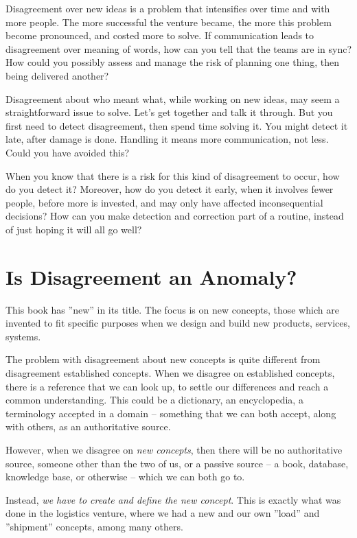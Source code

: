 \documentclass[graybox,envcountchap,sectrefs]{svmono}
\begin{document}
Disagreement over new ideas is a problem that intensifies over time and with more people. The more successful the venture became, the more this problem become pronounced, and costed more to solve. If communication leads to disagreement over meaning of words, how can you tell that the teams are in sync? How could you possibly assess and manage the risk of planning one thing, then being delivered another? 

Disagreement about who meant what, while working on new ideas, may seem a straightforward issue to solve. Let's get together and talk it through. But you first need to detect disagreement, then spend time solving it. You might detect it late, after damage is done. Handling it means more communication, not less. Could you have avoided this? 

When you know that there is a risk for this kind of disagreement to occur, how do you detect it? Moreover, how do you detect it early, when it involves fewer people, before more is invested, and may only have affected inconsequential decisions? How can you make detection and correction part of a routine, instead of just hoping it will all go well?

\section{Is Disagreement an Anomaly?}
This book has ''new'' in its title. The focus is on new concepts, those which are invented to fit specific purposes when we design and build new products, services, systems. 

The problem with disagreement about new concepts is quite different from disagreement established concepts. When we disagree  on established concepts, there is a reference that we can look up, to settle our differences and reach a common understanding. This could be a dictionary, an encyclopedia, a terminology accepted in a domain -- something that we can both accept, along with others, as an authoritative source. 

However, when we disagree on \textit{new concepts}, then there will be no authoritative source, someone other than the two of us, or a passive source -- a book, database, knowledge base, or otherwise -- which we can both go to. 

Instead, \textit{we have to create and define the new concept}. This is exactly what was done in the logistics venture, where we had a new and our own ''load'' and ''shipment'' concepts, among many others.
\end{document}
